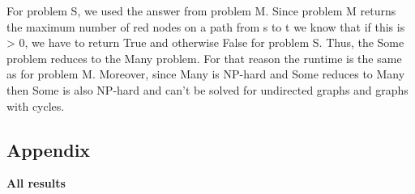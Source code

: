\documentclass{tufte-handout}
\begin{document}
For problem S, we used the answer from problem M. Since problem M returns the maximum number of red nodes on a path from s to t we know that if this is > 0, we have
to return True and otherwise False for problem S. Thus, the Some problem reduces to the Many problem.
For that reason the runtime is the same as for problem M. Moreover, since Many is NP-hard and Some reduces to Many then Some is also NP-hard and can't be solved for
undirected graphs and graphs with cycles.

\subsection{Appendix}
\textbf{All results}

\end{document}
